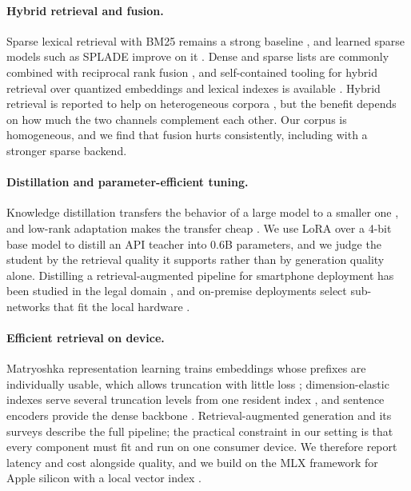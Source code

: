 \paragraph{Hybrid retrieval and fusion.}
Sparse lexical retrieval with BM25 remains a strong baseline
\citep{robertson2009bm25}, and learned sparse models such as SPLADE improve on
it \citep{formal2021splade}. Dense and sparse lists are commonly combined with
reciprocal rank fusion \citep{cormack2009reciprocal}, and self-contained
tooling for hybrid retrieval over quantized embeddings and lexical indexes is
available \citep{livieris2026quanta}. Hybrid retrieval is reported to help on
heterogeneous corpora \citep{luan2021sparse}, but the benefit depends on how
much the two channels complement each other. Our corpus is homogeneous, and we
find that fusion hurts consistently, including with a stronger sparse backend.

\paragraph{Distillation and parameter-efficient tuning.}
Knowledge distillation transfers the behavior of a large model to a smaller
one \citep{hinton2015distilling}, and low-rank adaptation makes the transfer
cheap \citep{hu2022lora,dettmers2023qlora}. We use LoRA over a 4-bit base model
to distill an API teacher into 0.6B parameters, and we judge the student by the
retrieval quality it supports rather than by generation quality alone.
Distilling a retrieval-augmented pipeline for smartphone deployment has been
studied in the legal domain \citep{kamal2026smartphone}, and on-premise
deployments select sub-networks that fit the local hardware
\citep{rizeakos2026onprem}.

\paragraph{Efficient retrieval on device.}
Matryoshka representation learning trains embeddings whose prefixes are
individually usable, which allows truncation with little loss
\citep{kusupati2022matryoshka}; dimension-elastic indexes serve several
truncation levels from one resident index \citep{culatana2026mrvq}, and
sentence encoders provide the dense backbone
\citep{reimers2019sentence,karpukhin2020dense}. Retrieval-augmented generation
\citep{lewis2020retrieval} and its surveys \citep{gao2023retrieval} describe
the full pipeline; the practical constraint in our setting is that every
component must fit and run on one consumer device. We therefore report latency
and cost alongside quality, and we build on the MLX framework for Apple silicon
\citep{mlx} with a local vector index \citep{qdrant}.

